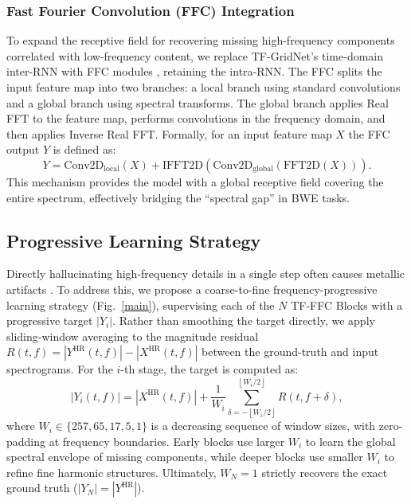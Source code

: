 \documentclass[journal]{IEEEtran}
\begin{document}
\subsubsection{Fast Fourier Convolution (FFC) Integration}
To expand the receptive field for recovering missing high-frequency components correlated with low-frequency content, we replace TF-GridNet's time-domain inter-RNN with FFC modules \cite{lama}, retaining the intra-RNN. 
The FFC splits the input feature map into two branches: a local branch using standard convolutions and a global branch using spectral transforms. The global branch applies Real FFT to the feature map, performs convolutions in the frequency domain, and then applies Inverse Real FFT. Formally, for an input feature map $X$ the FFC output $Y$ is defined as:
\begin{equation}
    Y = \text{Conv2D}_{\mathrm{local}}(X) + \text{IFFT2D}(\text{Conv2D}_{\mathrm{global}}(\text{FFT2D}(X))).
\end{equation}
This mechanism provides the model with a global receptive field covering the entire spectrum, effectively bridging the ``spectral gap'' in BWE tasks.

\subsection{Progressive Learning Strategy}


Directly hallucinating high-frequency details in a single step often causes metallic artifacts \cite{aero}. To address this, we propose a coarse-to-fine frequency-progressive learning strategy (Fig.~\ref{main}), supervising each of the $N$ TF-FFC Blocks with a progressive target $|Y_{i}|$. Rather than smoothing the target directly, we apply sliding-window averaging to the magnitude residual $R(t, f) = |Y^{\mathrm{HR}}(t, f)| - |X^{\mathrm{HR}}(t, f)|$ between the ground-truth and input spectrograms. For the $i$-th stage, the target is computed as:
\begin{equation}
    |Y_{i}(t, f)| = |X^{\mathrm{HR}}(t, f)| + \frac{1}{W_i} \sum_{\delta=-\left\lfloor W_i/2 \right\rfloor}^{\left\lfloor W_i/2 \right\rfloor} R(t, f+\delta),
\end{equation}
where $W_i \in \{257, 65, 17, 5, 1\}$ is a decreasing sequence of window sizes, with zero-padding at frequency boundaries. Early blocks use larger $W_i$ to learn the global spectral envelope of missing components, while deeper blocks use smaller $W_i$ to refine fine harmonic structures. Ultimately, $W_N = 1$ strictly recovers the exact ground truth ($|Y_{N}| = |Y^{\mathrm{HR}}|$).
\end{document}
